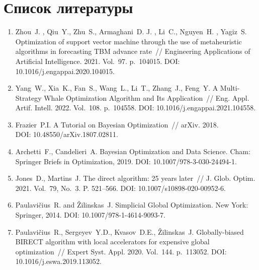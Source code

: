 \documentclass[a4paper,12pt,russian]{article}
\begin{document}
\section*{Список литературы}
\begin{enumerate}

\item \label{rfa:rulit:Zhou2021}
Zhou~J. , Qiu~Y.,  Zhu~S., Armaghani~D. J. , Li~C., Nguyen~H. , Yagiz~S. Optimization of support vector machine through the use of metaheuristic algorithms in forecasting {TBM} advance rate~// Engineering Applications of Artificial Intelligence. 2021. Vol.~97. p.~104015.  DOI: 10.1016/j.engappai.2020.104015.

\item \label{rfa:rulit:Yang2022}
Yang~W., Xia~K., Fan~S., Wang~L., Li~T., Zhang~J., Feng~Y. A Multi-Strategy Whale Optimization Algorithm and Its Application~// Eng. Appl. Artif. Intell. 2022. Vol.~108. p.~104558. DOI: 10.1016/j.engappai.2021.104558.

\item \label{rfa:rulit:Frazier2018}
Frazier~P.I. A Tutorial on Bayesian Optimization~// arXiv. 2018.\\DOI: 10.48550/arXiv.1807.02811.

\item \label{rfa:rulit:Archetti2019}
Archetti~F., Candelieri~A. Bayesian Optimization and Data Science. Cham: Springer Briefs in Optimization, 2019. DOI: 10.1007/978-3-030-24494-1.

\item \label{rfa:rulit:Jones2021}
Jones~D., Martins~J. The direct algorithm: 25 years later~// J. Glob. Optim. 2021. Vol.~79, No.~3. P. 521--566. DOI: 10.1007/s10898-020-00952-6.

\item \label{rfa:rulit:PaulaviciusZilinskas2014}
Paulavi{\v c}ius~R. and {\v Z}ilinskas~J. Simplicial Global Optimization. New York: Springer, 2014. DOI: 10.1007/978-1-4614-9093-7.

\item \label{rfa:rulit:Birect2020}
Paulavi{\v c}ius~R., Sergeyev~Y.D., Kvasov~D.E., {\v Z}ilinskas~J. Globally-biased {BIRECT} al\-go\-rithm with local accelerators for expensive global optimization~// Expert Syst. Appl. 2020. Vol.~144. p.~113052. DOI: 10.1016/j.eswa.2019.113052.


\end{enumerate}
\end{document}
